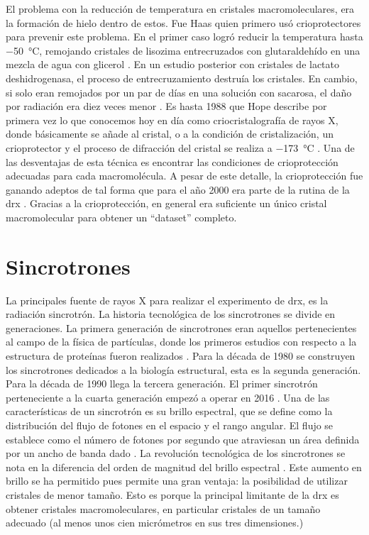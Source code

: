El problema con la reducción de temperatura en cristales macromoleculares, era la formación de hielo dentro de estos. Fue Haas quien primero usó crioprotectores para prevenir este problema. En el primer caso logró reducir la temperatura hasta \SI{-50}{\celsius}, remojando cristales de lisozima entrecruzados con glutaraldehído
en una mezcla de agua con glicerol . En un estudio posterior con cristales de lactato deshidrogenasa, el proceso de entrecruzamiento destruía los cristales. En cambio, si solo eran remojados por un par de días en una solución con sacarosa, el daño por radiación era diez veces menor . 
Es hasta 1988 que Hope describe por primera vez lo que conocemos hoy en día como criocristalografía de rayos X, donde básicamente se añade al cristal, o a la condición de cristalización, un crioprotector y el proceso de difracción del cristal se realiza a \SI{-173}{\celsius} . Una de las desventajas de esta técnica es encontrar las condiciones de crioprotección adecuadas para cada macromolécula. A pesar de este detalle, la crioprotección fue ganando adeptos de tal forma
que para el año 2000 era parte de la rutina de la \acrshort{drx} . Gracias a la crioprotección, en general era suficiente un único cristal macromolecular para obtener un
\enquote{dataset} completo.

\section{Sincrotrones}
La principales fuente de rayos X para realizar el experimento de \acrshort{drx}, es la radiación sincrotrón.
La historia tecnológica de los sincrotrones se divide en generaciones. La primera generación de sincrotrones eran aquellos pertenecientes al campo de la física de partículas, donde los primeros estudios con respecto a la estructura de proteínas fueron realizados . Para la década de 1980 se construyen los sincrotrones dedicados a la biología estructural, esta es la segunda generación. Para la década de 1990 llega la tercera generación. El primer sincrotrón perteneciente a la cuarta generación empezó a operar en 2016 . 
Una de las características de un sincrotrón es su brillo espectral, que se define como la distribución del flujo de fotones en el espacio y el rango angular. El flujo se establece como el número de fotones por segundo que atraviesan un área definida por un ancho de banda dado . La revolución tecnológica de los sincrotrones se nota en la diferencia del orden de magnitud del brillo espectral \cite{Willmott2019}. Este aumento en brillo se ha permitido pues permite una gran ventaja: la posibilidad de utilizar cristales de menor tamaño. Esto es porque la principal limitante de la \acrshort{drx} es obtener cristales macromoleculares, en particular cristales de un tamaño adecuado (al menos unos cien micrómetros en sus tres dimensiones.) 

